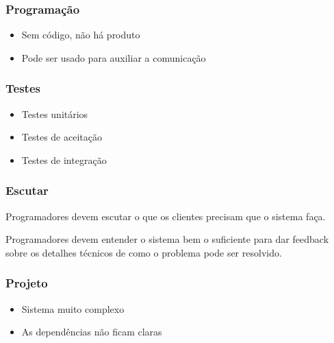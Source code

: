 \documentclass[10pt]{beamer}
\begin{document}

\begin{frame}
  \frametitle{Programação}
  \begin{itemize}
  \item Sem código, não há produto
  \item Pode ser usado para auxiliar a comunicação
  \end{itemize}
\end{frame}

\begin{frame}
  \frametitle{Testes}
  \begin{itemize}
  \item Testes unitários
  \item Testes de aceitação
  \item Testes de integração
  \end{itemize}
\end{frame}

\begin{frame}
  \frametitle{Escutar}
  Programadores devem escutar o que os clientes precisam que o sistema faça.

  \pause
  Programadores devem entender o sistema bem o suficiente para dar feedback
  sobre os detalhes técnicos de como o problema pode ser resolvido.
\end{frame}

\begin{frame}
  \frametitle{Projeto}
  \begin{itemize}
  \item Sistema muito complexo
  \item As dependências não ficam claras
  \end{itemize}
\end{frame}
\end{document}
